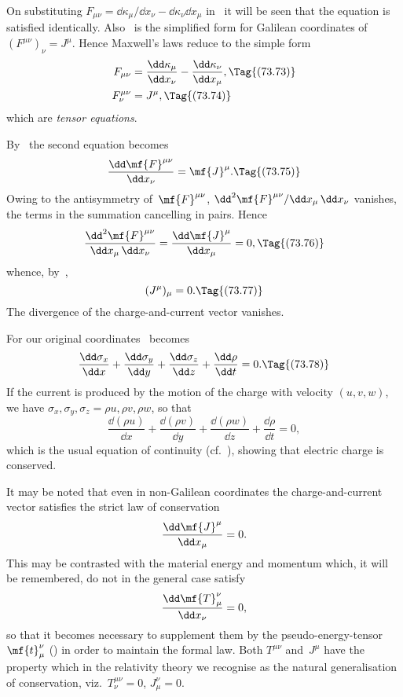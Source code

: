\documentclass[12pt]{book}
\begin{document}
On substituting $F_{\mu\nu} = \dd\kappa_{\mu}/\dd x_{\nu} - \dd\kappa_{\nu}\dd x_{\mu}$ in~ it will be seen that the
equation is satisfied identically. Also ~is the simplified form for Galilean
coordinates of $(F^{\mu\nu})_{\nu} = J^{\mu}$. Hence Maxwell's laws reduce to the simple form
\begin{align*}
  F_{\mu\nu} &= \frac{\dd\kappa_{\mu}}{\dd x_{\nu}} - \frac{\dd\kappa_{\nu}}{\dd x_{\mu}},
  \Tag{(73.73)} \\
  F_{\nu}^{\mu\nu} &= J^{\mu},
  \Tag{(73.74)}
  \end{align*}
which are \emph{tensor equations}.

By~ the second equation becomes
\[
\frac{\dd\mf{F}^{\mu\nu}}{\dd x_{\nu}} = \mf{J}^{\mu}.
\Tag{(73.75)}
\]
Owing to the antisymmetry of~$\mf{F}^{\mu\nu}$, $\dd^{2}\mf{F}^{\mu\nu}/\dd x_{\mu}\, \dd x_{\nu}$ vanishes, the terms in the
summation cancelling in pairs. Hence
\[
\frac{\dd^{2}\mf{F}^{\mu\nu}}{\dd x_{\mu}\, \dd x_{\nu}}
= \frac{\dd\mf{J}^{\mu}}{\dd x_{\mu}} = 0,
\Tag{(73.76)}
\]
whence, by~,
\[
(J^{\mu})_{\mu} = 0.
\Tag{(73.77)}
\]
The divergence of the charge\hyp{}and\hyp{}current vector vanishes.
%
%

For our original coordinates ~becomes
\[
\frac{\dd\sigma_{x}}{\dd x}
+ \frac{\dd\sigma_{y}}{\dd y}
+ \frac{\dd\sigma_{z}}{\dd z}
+ \frac{\dd\rho}{\dd t} = 0.
\Tag{(73.78)}
\]
If the current is produced by the motion of the charge with velocity $(u, v, w)$,
we have $\sigma_{x}, \sigma_{y}, \sigma_{z} = \rho u, \rho v, \rho w$, so that
\[
\frac{\dd(\rho u)}{\dd x}
+ \frac{\dd(\rho v)}{\dd y}
+ \frac{\dd(\rho w)}{\dd z}
+ \frac{\dd\rho}{\dd t} = 0,
\]
which is the usual equation of continuity (cf.~), showing that electric
%
charge is conserved.

It may be noted that even in non\hyp{}Galilean coordinates the charge\hyp{}and\hyp{}current
vector satisfies the strict law of conservation
%
\[
\frac{\dd\mf{J}^{\mu}}{\dd x_{\mu}} = 0.
\]
This may be contrasted with the material energy and momentum which, it will
be remembered, do not in the general case satisfy
\[
\frac{\dd\mf{T}_{\mu}^{\nu}}{\dd x_{\nu}} = 0,
\]
so that it becomes necessary to supplement them by the pseudo\hyp{}energy\hyp{}tensor~$\mf{t}_{\mu}^{\nu}$
() in order to maintain the formal law. Both $T^{\mu\nu}$ and~$J^{\mu}$ have the
property which in the relativity theory we recognise as the natural generalisation
of conservation, viz.\ $T_{\nu}^{\mu\nu} = 0$, $J_{\mu}^{\nu} = 0$.
\end{document}
